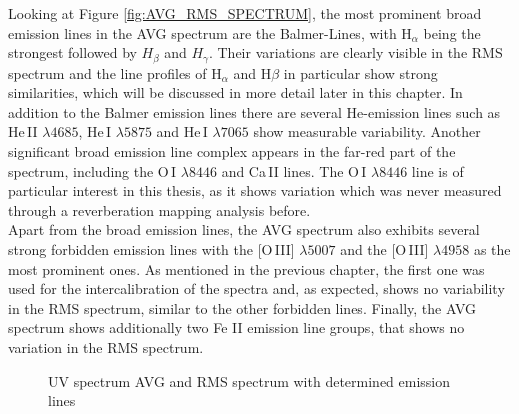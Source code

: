 Looking at Figure \ref{fig:AVG_RMS_SPECTRUM}, the most prominent broad emission lines in the AVG spectrum are the Balmer-Lines, with H$_\alpha$ being the strongest followed by $H_\beta$ and $H_\gamma$. Their variations are clearly visible in the RMS spectrum and the line profiles of H$_\alpha$ and H$\beta$ in particular show strong similarities, which will be discussed in more detail later in this chapter. In addition to the Balmer emission lines there are several He-emission lines such as He\,II $\lambda 4685$, He\,I $\lambda 5875$ and He\,I $\lambda 7065$ show measurable variability. Another significant broad emission line complex appears in the far-red part of the spectrum, including the O\,I $\lambda 8446$ and Ca\,II lines. The O\,I $\lambda 8446$ line is of particular interest in this thesis, as it shows variation which was never measured through a reverberation mapping analysis before. \\
Apart from the broad emission lines, the AVG spectrum also exhibits several strong forbidden emission lines with the [O\,III] $\lambda 5007$ and the [O\,III] $\lambda 4958$ as the most prominent ones. As mentioned in the previous chapter, the first one was used for the intercalibration of the spectra and, as expected, shows no variability in the RMS spectrum, similar to the other forbidden lines. Finally, the AVG spectrum shows additionally two Fe II emission line groups, that shows no variation in the RMS spectrum.

\begin{figure}[!htbp]
	\centering
	\caption{UV spectrum AVG and RMS spectrum with determined emission lines}
	\label{fig:UV_uncalibrated_AVG_RMS}
\end{figure}


